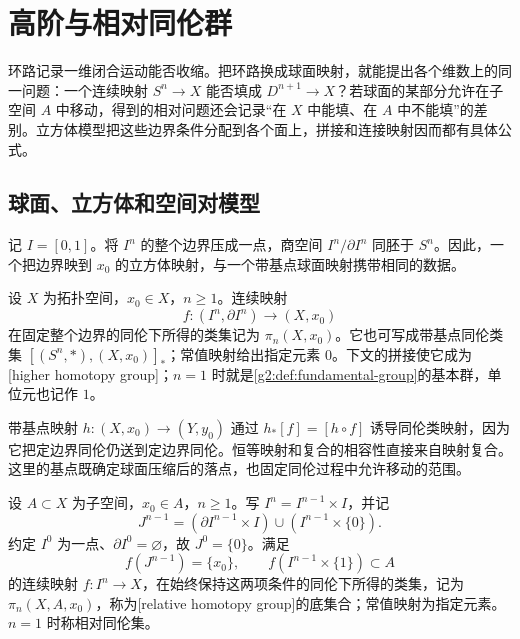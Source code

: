 
% 
% 

\section{高阶与相对同伦群}
\label{g2:sec:0801}

环路记录一维闭合运动能否收缩。把环路换成球面映射，就能提出各个维数上的同一问题：一个连续映射 \(S^n\to X\) 能否填成 \(D^{n+1}\to X\)？若球面的某部分允许在子空间 \(A\) 中移动，得到的相对问题还会记录“在 \(X\) 中能填、在 \(A\) 中不能填”的差别。立方体模型把这些边界条件分配到各个面上，拼接和连接映射因而都有具体公式。

\subsection{球面、立方体和空间对模型}
\label{g2:subsec:0801:01}

记 \(I=[0,1]\)。将 \(I^n\) 的整个边界压成一点，商空间 \(I^n/\partial I^n\) 同胚于 \(S^n\)。因此，一个把边界映到 \(x_0\) 的立方体映射，与一个带基点球面映射携带相同的数据。

\begin{definition}[高阶同伦群]\label{g2:def:higher-homotopy}
	设 \(X\) 为拓扑空间，\(x_0\in X\)，\(n\ge1\)。连续映射
	\[
		f:(I^n,\partial I^n)\longrightarrow(X,x_0)
	\]
	在固定整个边界的同伦下所得的类集记为 \(\pi_n(X,x_0)\)。它也可写成带基点同伦类集 \([(S^n,*),(X,x_0)]_*\)；常值映射给出指定元素 \(0\)。下文的拼接使它成为[higher homotopy group]；\(n=1\) 时就是\cref{g2:def:fundamental-group}的基本群，单位元也记作 \(1\)。
\end{definition}

带基点映射 \(h:(X,x_0)\to(Y,y_0)\) 通过 \(h_*[f]=[h\circ f]\) 诱导同伦类映射，因为它把定边界同伦仍送到定边界同伦。恒等映射和复合的相容性直接来自映射复合。这里的基点既确定球面压缩后的落点，也固定同伦过程中允许移动的范围。

\begin{definition}\label{g2:def:relative-homotopy}
	设 \(A\subset X\) 为子空间，\(x_0\in A\)，\(n\ge1\)。写 \(I^n=I^{n-1}\times I\)，并记
	\[
		J^{n-1}=(\partial I^{n-1}\times I)\cup(I^{n-1}\times\{0\}).
	\]
	约定 \(I^0\) 为一点、\(\partial I^0=\varnothing\)，故 \(J^0=\{0\}\)。满足
	\[
		f(J^{n-1})=\{x_0\},\qquad f(I^{n-1}\times\{1\})\subset A
	\]
	的连续映射 \(f:I^n\to X\)，在始终保持这两项条件的同伦下所得的类集，记为 \(\pi_n(X,A,x_0)\)，称为[relative homotopy group]的底集合；常值映射为指定元素。\(n=1\) 时称相对同伦集。
\end{definition}

